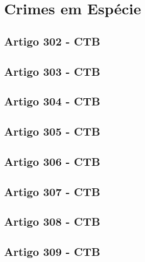 \documentclass[
  letterpaper,
  DIV=11,
  numbers=noendperiod]{scrreport}
\begin{document}

\hypertarget{crimes-em-espuxe9cie}{%
\chapter{Crimes em Espécie}\label{crimes-em-espuxe9cie}}

\hypertarget{artigo-302---ctb}{%
\section{\texorpdfstring{\textbf{Artigo 302 -
CTB}}{Artigo 302 - CTB}}\label{artigo-302---ctb}}

\hypertarget{artigo-303---ctb}{%
\section{\texorpdfstring{\textbf{Artigo 303 -
CTB}}{Artigo 303 - CTB}}\label{artigo-303---ctb}}

\hypertarget{artigo-304---ctb}{%
\section{\texorpdfstring{\textbf{Artigo 304 -
CTB}}{Artigo 304 - CTB}}\label{artigo-304---ctb}}

\hypertarget{artigo-305---ctb}{%
\section{\texorpdfstring{\textbf{Artigo 305 -
CTB}}{Artigo 305 - CTB}}\label{artigo-305---ctb}}

\hypertarget{artigo-306---ctb}{%
\section{\texorpdfstring{\textbf{Artigo 306 -
CTB}}{Artigo 306 - CTB}}\label{artigo-306---ctb}}

\hypertarget{artigo-307---ctb}{%
\section{\texorpdfstring{\textbf{Artigo 307 -
CTB}}{Artigo 307 - CTB}}\label{artigo-307---ctb}}

\hypertarget{artigo-308---ctb}{%
\section{\texorpdfstring{\textbf{Artigo 308 -
CTB}}{Artigo 308 - CTB}}\label{artigo-308---ctb}}

\hypertarget{artigo-309---ctb}{%
\section{\texorpdfstring{\textbf{Artigo 309 -
CTB}}{Artigo 309 - CTB}}\label{artigo-309---ctb}}
\end{document}
